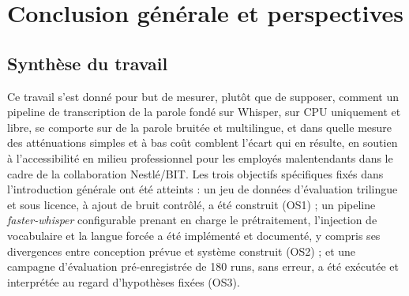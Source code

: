 \documentclass[12pt]{report}
\begin{document}
\chapter*{Conclusion générale et perspectives}
\thispagestyle{fancy}
\section*{Synthèse du travail}
Ce travail s'est donné pour but de mesurer, plutôt que de supposer, comment un pipeline de transcription de la parole fondé sur Whisper, sur CPU uniquement et libre, se comporte sur de la parole bruitée et multilingue, et dans quelle mesure des atténuations simples et à bas coût comblent l'écart qui en résulte, en soutien à l'accessibilité en milieu professionnel pour les employés malentendants dans le cadre de la collaboration Nestl\'e/BIT. Les trois objectifs spécifiques fixés dans l'introduction générale ont été atteints : un jeu de données d'évaluation trilingue et sous licence, à ajout de bruit contrôlé, a été construit (OS1) ; un pipeline \textit{faster-whisper} configurable prenant en charge le prétraitement, l'injection de vocabulaire et la langue forcée a été implémenté et documenté, y compris ses divergences entre conception prévue et système construit (OS2) ; et une campagne d'évaluation pré-enregistrée de 180 runs, sans erreur, a été exécutée et interprétée au regard d'hypothèses fixées (OS3).
\end{document}
